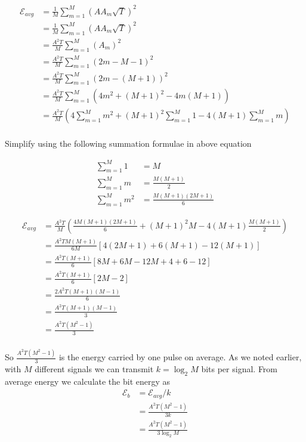 \documentclass[a4paper]{article}
\numberwithin{equation}{subsection}
\begin{document}
	
	\begin{equation}\label{key}
	\begin{aligned}
	\mathcal{E}_{avg} &=\frac{1}{M} \sum_{m=1}^{M} (A A_m \sqrt{T})^2 \\
	&=\frac{1}{M} \sum_{m=1}^{M} (A A_m \sqrt{T})^2\\
	&=\frac{A^2 T}{M} \sum_{m=1}^{M} (A_m)^2  \\
	&=\frac{A^2 T}{M} \sum_{m=1}^{M} (2m-M-1)^2  \\
	&=\frac{A^2 T}{M} \sum_{m=1}^{M} (2m-(M+1))^2  \\
	&=\frac{A^2 T}{M} \sum_{m=1}^{M} (4m^2+(M+1)^2-4m(M+1))  \\
	&=\frac{A^2 T}{M} \left(4\sum_{m=1}^{M} m^2+(M+1)^2 \sum_{m=1}^{M} 1 -4(M+1)\sum_{m=1}^{M}m \right)  \\
	\end{aligned}
	\end{equation} 
	
	Simplify using the following summation formulae in above equation
	
	\begin{align}\label{key}
	\sum_{m=1}^{M} 1 &= M\\
	\sum_{m=1}^{M} m &= \frac{M(M+1)}{2} \\
	\sum_{m=1}^{M} m^2 &= \frac{M(M+1)(2M+1)}{6}
	\end{align} 
	
	\begin{equation}\label{eq:Eavg1}
	\begin{aligned}
	\mathcal{E}_{avg}
	&=\frac{A^2 T}{M} \left(\frac{4M(M+1)(2M+1)}{6} +(M+1)^2 M -4(M+1) \frac{M(M+1)}{2}  \right)  \\
	&=\frac{A^2 T M(M+1)}{6M} [4 (2M+1) +6(M+1) -12(M+1) ]  \\
	&=\frac{A^2 T (M+1)}{6} [8M+6M-12M+4+6-12]  \\
	&=\frac{A^2 T (M+1)}{6} [2M-2]  \\
	&=\frac{2A^2 T (M+1)(M-1)}{6} \\
	&=\frac{A^2 T (M+1)(M-1)}{3} \\
	&=\frac{A^2 T (M^2-1)}{3} \\
	\end{aligned}
	\end{equation} 
	
	So $\frac{A^2 T (M^2-1)}{3}$ is the energy carried by one pulse on average. As we noted earlier, with $M$ different signals we can transmit $k=\log_2{M}$ bits per signal. From average energy we calculate the bit energy as
	\begin{equation}\label{eq:eb1}
	\begin{aligned}
	\mathcal{E}_b
	&=\mathcal{E}_{avg}/k\\
	&=\frac{A^2 T (M^2-1)}{3k}\\
	&=\frac{A^2 T (M^2-1)}{3\log_2{M}}\\
	\end{aligned}
	\end{equation} 
	
\end{document}
